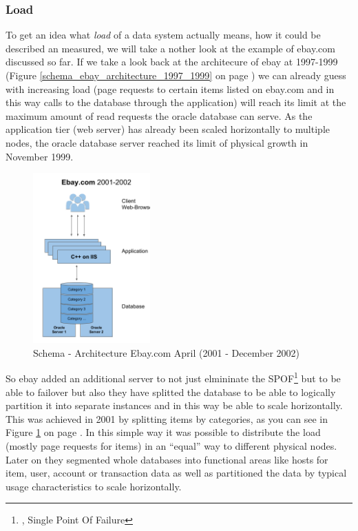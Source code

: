 \subsubsection{Load}
\label{tf_nfreq_scalability_load}
To get an idea what \textit{load} of a data system actually means, how it could be described an measured, we will take a nother look at the example of ebay.com discussed so far. If we take a look back at the architecure of ebay at 1997-1999 (Figure \ref{schema_ebay_architecture_1997_1999} on page \pageref{schema_ebay_architecture_1997_1999}) we can already guess with increasing load (page requests to certain items listed on ebay.com and in this way calls to the database through the application) will reach its limit at the maximum amount of read requests the oracle database can serve. As the application tier (web server) has already been scaled horizontally to multiple nodes, the oracle database server reached its limit of physical growth in November 1999. \\
\begin{figure}[ht]
	\centering
  \includegraphics[width=0.4\textwidth]{Ebay_2002.png}
	\caption{Schema - Architecture Ebay.com April (2001 - December 2002)}
	\label{schema_ebay_2002}
\end{figure}

So ebay added an additional server to not just elmininate the SPOF\footnote{\cite{WPSPOF}, Single Point Of Failure} but to be able to failover but also they have splitted the database to be able to logically partition it into separate instances and in this way be able to scale horizontally. This was achieved in 2001 by splitting items by categories, as you can see in Figure \ref{schema_ebay_2002} on page \pageref{schema_ebay_2002}. In this simple way it was possible to distribute the load (mostly page requests for items) in an ``equal'' way to different physical nodes.
Later on they segmented whole databases into functional areas like hosts for item, user, account or transaction data as well as partitioned the data by typical usage characteristics to scale horizontally.\\

